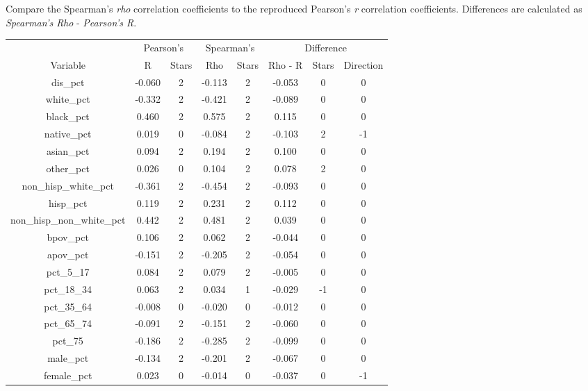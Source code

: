 \documentclass[
]{article}
\begin{document}
Compare the Spearman's \emph{rho} correlation coefficients to the
reproduced Pearson's \emph{r} correlation coefficients. Differences are
calculated as \emph{Spearman's Rho} - \emph{Pearson's R}.

\begin{table}
\centering
\begin{tabular}{c|c|c|c|c|c|c|c}
\hline
\multicolumn{1}{c|}{ } & \multicolumn{2}{c|}{Pearson's} & \multicolumn{2}{c|}{Spearman's} & \multicolumn{3}{c}{Difference} \\
\cline{2-3} \cline{4-5} \cline{6-8}
Variable & R & Stars & Rho & Stars & Rho - R & Stars & Direction\\
\hline
dis\_pct & -0.060 & 2 & -0.113 & 2 & -0.053 & 0 & 0\\
\hline
white\_pct & -0.332 & 2 & -0.421 & 2 & -0.089 & 0 & 0\\
\hline
black\_pct & 0.460 & 2 & 0.575 & 2 & 0.115 & 0 & 0\\
\hline
native\_pct & 0.019 & 0 & -0.084 & 2 & -0.103 & 2 & -1\\
\hline
asian\_pct & 0.094 & 2 & 0.194 & 2 & 0.100 & 0 & 0\\
\hline
other\_pct & 0.026 & 0 & 0.104 & 2 & 0.078 & 2 & 0\\
\hline
non\_hisp\_white\_pct & -0.361 & 2 & -0.454 & 2 & -0.093 & 0 & 0\\
\hline
hisp\_pct & 0.119 & 2 & 0.231 & 2 & 0.112 & 0 & 0\\
\hline
non\_hisp\_non\_white\_pct & 0.442 & 2 & 0.481 & 2 & 0.039 & 0 & 0\\
\hline
bpov\_pct & 0.106 & 2 & 0.062 & 2 & -0.044 & 0 & 0\\
\hline
apov\_pct & -0.151 & 2 & -0.205 & 2 & -0.054 & 0 & 0\\
\hline
pct\_5\_17 & 0.084 & 2 & 0.079 & 2 & -0.005 & 0 & 0\\
\hline
pct\_18\_34 & 0.063 & 2 & 0.034 & 1 & -0.029 & -1 & 0\\
\hline
pct\_35\_64 & -0.008 & 0 & -0.020 & 0 & -0.012 & 0 & 0\\
\hline
pct\_65\_74 & -0.091 & 2 & -0.151 & 2 & -0.060 & 0 & 0\\
\hline
pct\_75 & -0.186 & 2 & -0.285 & 2 & -0.099 & 0 & 0\\
\hline
male\_pct & -0.134 & 2 & -0.201 & 2 & -0.067 & 0 & 0\\
\hline
female\_pct & 0.023 & 0 & -0.014 & 0 & -0.037 & 0 & -1\\
\hline
\end{tabular}
\end{table}
\end{document}

